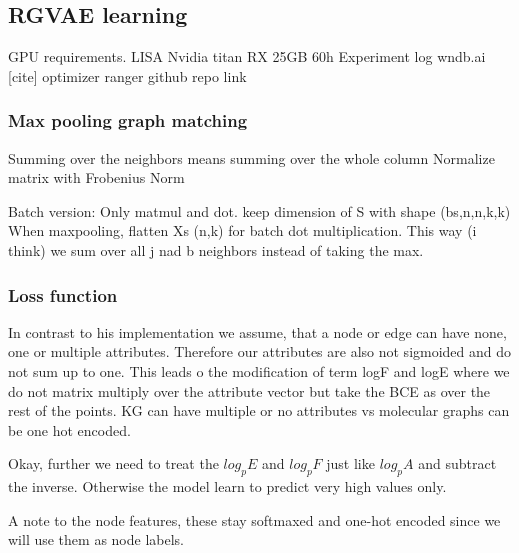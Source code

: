\subsection{RGVAE learning}
GPU requirements.
LISA
Nvidia titan RX 25GB 60h
Experiment log wndb.ai [cite]
optimizer ranger github repo link

\subsubsection{Max pooling graph matching}

Summing over the neighbors means summing over the whole column
Normalize matrix with Frobenius Norm

Batch version:
Only matmul and dot. keep dimension of S with shape (bs,n,n,k,k)
When maxpooling, flatten Xs (n,k) for batch dot multiplication. This way (i think) we sum over all j nad b neighbors instead of taking the max.  

\subsubsection{Loss function}




In contrast to his implementation we assume, that a node or edge can have none, one or multiple attributes. Therefore our attributes are also not sigmoided and do not sum up to one. This leads o the modification of term logF and logE where we do not matrix multiply over the attribute vector but take the BCE as over the rest of the points.
KG can have multiple or no attributes vs molecular graphs can be one hot encoded.

Okay, further we need to treat the $log_pE$ and $log_pF$ just like $log_pA$ and subtract the inverse. Otherwise the model learn to predict very high values only. 

A note to the node features, these stay softmaxed and one-hot encoded since we will use them as node labels.

